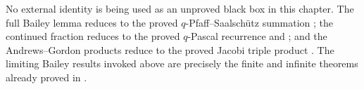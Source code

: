 \begin{remark}
\label{qg:rem:bailey-andrews-gordon-dependencies}
No external identity is being used as an unproved black box in this chapter.
The full Bailey lemma reduces to the proved
\(q\)-Pfaff--Saalsch\"utz summation ; the
continued fraction reduces to the proved \(q\)-Pascal recurrence and
; and the Andrews--Gordon products reduce to
the proved Jacobi triple product .  The limiting Bailey
results invoked above are precisely the finite and infinite theorems already
proved in .
\end{remark}
